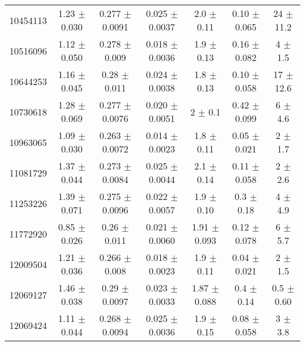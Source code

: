 \documentclass[epjCONF,columns]{svjour} %
\begin{document}
\begin{table*}
\begin{tabular}{c|cccccc}
10454113 &        1.23   $\pm$  0.030    &        0.277  $\pm$  0.0091   &        0.025  $\pm$  0.0037   &        2.0    $\pm$  0.11     &        0.10   $\pm$  0.065    &       24      $\pm$  11.2     \\
10516096 &        1.12   $\pm$  0.050    &        0.278  $\pm$  0.009    &        0.018  $\pm$  0.0036   &        1.9    $\pm$  0.13     &        0.16   $\pm$  0.082    &        4      $\pm$  1.5      \\
10644253 &        1.16   $\pm$  0.045    &        0.28   $\pm$  0.011    &        0.024  $\pm$  0.0038   &        1.8    $\pm$  0.13     &        0.10   $\pm$  0.058    &       17      $\pm$  12.6     \\
10730618 &        1.28   $\pm$  0.069    &        0.277  $\pm$  0.0076   &        0.020  $\pm$  0.0051   &        2      $\pm$  0.1      &        0.42   $\pm$  0.099    &        6      $\pm$  4.6      \\
10963065 &        1.09   $\pm$  0.030    &        0.263  $\pm$  0.0072   &        0.014  $\pm$  0.0023   &        1.8    $\pm$  0.11     &        0.05   $\pm$  0.021    &        2      $\pm$  1.7      \\
11081729 &        1.37   $\pm$  0.044    &        0.273  $\pm$  0.0084   &        0.025  $\pm$  0.0044   &        2.1    $\pm$  0.14     &        0.11   $\pm$  0.058    &        2      $\pm$  2.6      \\
11253226 &        1.39   $\pm$  0.071    &        0.275  $\pm$  0.0096   &        0.022  $\pm$  0.0057   &        1.9    $\pm$  0.10     &        0.3    $\pm$  0.18     &        4      $\pm$  4.9      \\
11772920 &        0.85   $\pm$  0.026    &        0.26   $\pm$  0.011    &        0.021  $\pm$  0.0060   &        1.91   $\pm$  0.093    &        0.12   $\pm$  0.078    &        6      $\pm$  5.7      \\
12009504 &        1.21   $\pm$  0.036    &        0.266  $\pm$  0.008    &        0.018  $\pm$  0.0023   &        1.9    $\pm$  0.11     &        0.04   $\pm$  0.021    &        2      $\pm$  1.5      \\
12069127 &        1.46   $\pm$  0.038    &        0.29   $\pm$  0.0097   &        0.023  $\pm$  0.0033   &        1.87   $\pm$  0.088    &        0.4    $\pm$  0.14     &        0.5    $\pm$  0.60     \\
12069424 &        1.11   $\pm$  0.044    &        0.268  $\pm$  0.0094   &        0.025  $\pm$  0.0036   &        1.9    $\pm$  0.15     &        0.08   $\pm$  0.058    &        3      $\pm$  3.8      \\

\end{tabular}
\end{table*}
\end{document}
